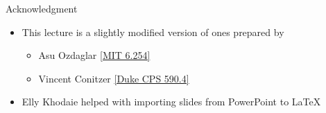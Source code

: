 \documentclass[11pt,aspectratio=169,handout]{beamer}
\begin{document}
  
  \begin{frame}{Acknowledgment}
   \begin{itemize}
   \setlength{\itemsep}{1em}
    \item This lecture is a slightly modified version of ones prepared by
    \begin{itemize}
     \item Asu Ozdaglar \href{https://ocw.mit.edu/courses/electrical-engineering-and-computer-science/6-254-game-theory-with-engineering-applications-spring-2010/index.htm}{[MIT 6.254]}
     \item Vincent Conitzer \href{https://courses.cs.duke.edu/spring16/compsci590.4/}{[Duke CPS 590.4]}
    \end{itemize}
    \item Elly Khodaie helped with importing slides from PowerPoint to \LaTeX
   \end{itemize}
  \end{frame}
\end{document}
